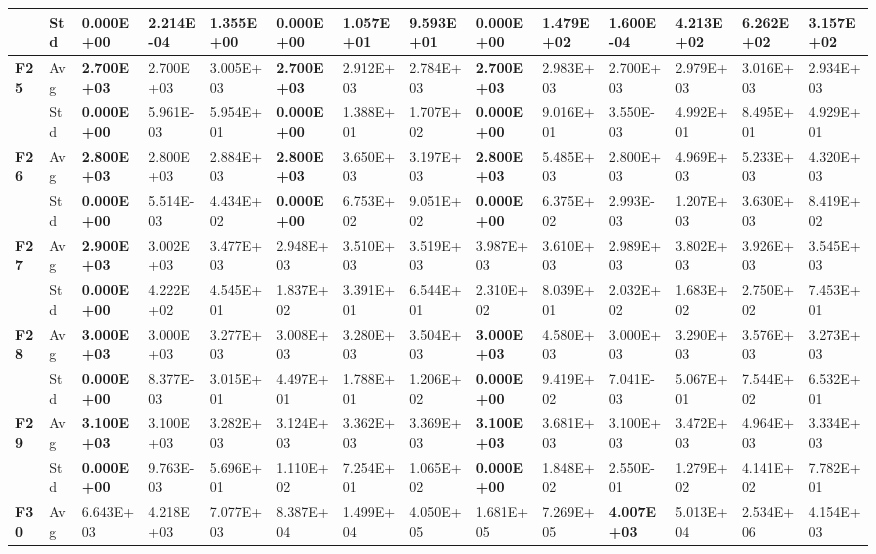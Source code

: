 \documentclass{article} %
\begin{document}
\begin{tabular}{|p{0.2in}|p{0.2in}|p{0.4in}|p{0.4in}|p{0.4in}|p{0.4in}|p{0.4in}|p{0.4in}|p{0.4in}|p{0.4in}|p{0.4in}|p{0.4in}|p{0.4in}|p{0.4in}|}
\textbf{} & Std & \textbf{0.000E+00} & 2.214E-04 & 1.355E+00 & \textbf{0.000E+00} & 1.057E+01 & 9.593E+01 & \textbf{0.000E+00} & 1.479E+02 & 1.600E-04 & 4.213E+02 & 6.262E+02 & 3.157E+02 \\ \hline 
\textbf{F25} & Avg & \textbf{2.700E+03} & 2.700E+03 & 3.005E+03 & \textbf{2.700E+03} & 2.912E+03 & 2.784E+03 & \textbf{2.700E+03} & 2.983E+03 & 2.700E+03 & 2.979E+03 & 3.016E+03 & 2.934E+03 \\ \hline 
\textbf{} & Std & \textbf{0.000E+00} & 5.961E-03 & 5.954E+01 & \textbf{0.000E+00} & 1.388E+01 & 1.707E+02 & \textbf{0.000E+00} & 9.016E+01 & 3.550E-03 & 4.992E+01 & 8.495E+01 & 4.929E+01 \\ \hline 
\textbf{F26} & Avg & \textbf{2.800E+03} & 2.800E+03 & 2.884E+03 & \textbf{2.800E+03} & 3.650E+03 & 3.197E+03 & \textbf{2.800E+03} & 5.485E+03 & 2.800E+03 & 4.969E+03 & 5.233E+03 & 4.320E+03 \\ \hline 
\textbf{} & Std & \textbf{0.000E+00} & 5.514E-03 & 4.434E+02 & \textbf{0.000E+00} & 6.753E+02 & 9.051E+02 & \textbf{0.000E+00} & 6.375E+02 & 2.993E-03 & 1.207E+03 & 3.630E+03 & 8.419E+02 \\ \hline 
\textbf{F27} & Avg & \textbf{2.900E+03} & 3.002E+03 & 3.477E+03 & 2.948E+03 & 3.510E+03 & 3.519E+03 & 3.987E+03 & 3.610E+03 & 2.989E+03 & 3.802E+03 & 3.926E+03 & 3.545E+03 \\ \hline 
\textbf{} & Std & \textbf{0.000E+00} & 4.222E+02 & 4.545E+01 & 1.837E+02 & 3.391E+01 & 6.544E+01 & 2.310E+02 & 8.039E+01 & 2.032E+02 & 1.683E+02 & 2.750E+02 & 7.453E+01 \\ \hline 
\textbf{F28} & Avg & \textbf{3.000E+03} & 3.000E+03 & 3.277E+03 & 3.008E+03 & 3.280E+03 & 3.504E+03 & \textbf{3.000E+03} & 4.580E+03 & 3.000E+03 & 3.290E+03 & 3.576E+03 & 3.273E+03 \\ \hline 
\textbf{} & Std & \textbf{0.000E+00} & 8.377E-03 & 3.015E+01 & 4.497E+01 & 1.788E+01 & 1.206E+02 & \textbf{0.000E+00} & 9.419E+02 & 7.041E-03 & 5.067E+01 & 7.544E+02 & 6.532E+01 \\ \hline 
\textbf{F29} & Avg & \textbf{3.100E+03} & 3.100E+03 & 3.282E+03 & 3.124E+03 & 3.362E+03 & 3.369E+03 & \textbf{3.100E+03} & 3.681E+03 & 3.100E+03 & 3.472E+03 & 4.964E+03 & 3.334E+03 \\ \hline 
\textbf{} & Std & \textbf{0.000E+00} & 9.763E-03 & 5.696E+01 & 1.110E+02 & 7.254E+01 & 1.065E+02 & \textbf{0.000E+00} & 1.848E+02 & 2.550E-01 & 1.279E+02 & 4.141E+02 & 7.782E+01 \\ \hline 
\textbf{F30} & Avg & 6.643E+03 & 4.218E+03 & 7.077E+03 & 8.387E+04 & 1.499E+04 & 4.050E+05 & 1.681E+05 & 7.269E+05 & \textbf{4.007E+03} & 5.013E+04 & 2.534E+06 & 4.154E+03 \\ \hline 

\end{tabular}
\end{document}
